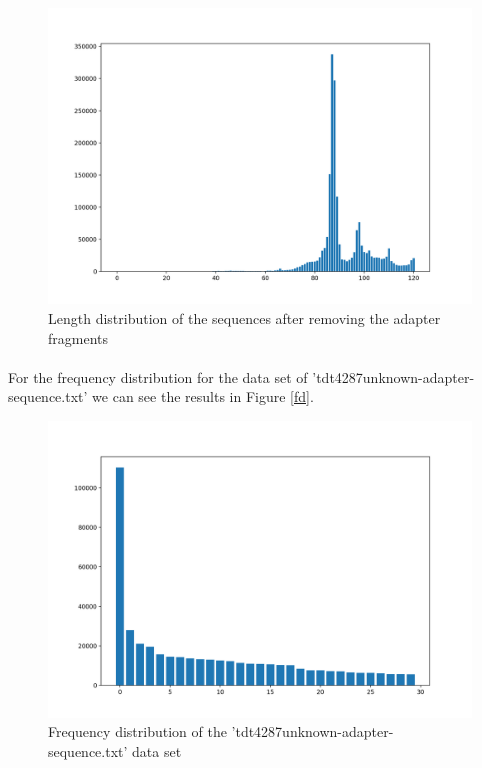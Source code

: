 \documentclass[a4paper,10pt]{article}
\begin{document}
\begin{figure}[H]
    \centering
    \includegraphics[width=12cm]{images/length-distr-task4.png}
    \caption{Length distribution of the sequences after removing the adapter fragments}
    \label{fig:ld4}
\end{figure}

\paragraph{} For the frequency distribution for the data set of 'tdt4287unknown-adapter-sequence.txt' we can see the results in Figure \ref{fd}.

\begin{figure}[H]
    \centering
    \includegraphics[width=12cm]{images/freq-distr.png}
    \caption{Frequency distribution of the 'tdt4287unknown-adapter-sequence.txt' data set}
    \label{fig:fd}
\end{figure}
\end{document}
